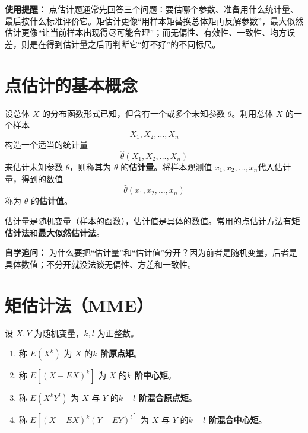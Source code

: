 ﻿\documentclass[lang=cn,11pt]{elegantbook}
\begin{document}
\begin{note}
\textbf{使用提醒：} 点估计题通常先回答三个问题：要估哪个参数、准备用什么统计量、最后按什么标准评价它。矩估计更像“用样本矩替换总体矩再反解参数”，最大似然估计更像“让当前样本出现得尽可能合理”；而无偏性、有效性、一致性、均方误差，则是在得到估计量之后再判断它“好不好”的不同标尺。
\end{note}

\section{点估计的基本概念}

\begin{definition}[点估计] \label{def:point-est}
设总体 \(X\) 的分布函数形式已知，但含有一个或多个未知参数 \(\theta\)。利用总体 \(X\) 的一个样本 \[X_1, X_2, \dots, X_n\]
构造一个适当的统计量 \[\hat{\theta}(X_1, X_2, \dots, X_n)\] 
来估计未知参数 \(\theta\)，则称其为 \(\theta\) 的\textbf{估计量}。将样本观测值 \(x_1, x_2, \dots, x_n\)代入估计量，得到的数值 \[\hat{\theta}(x_1, x_2, \dots, x_n)\] 称为 \(\theta\) 的\textbf{估计值}。
\end{definition}

\begin{note}
估计量是随机变量（样本的函数），估计值是具体的数值。常用的点估计方法有\textbf{矩估计法}和\textbf{最大似然估计法}。
\end{note}

\begin{note}
\textbf{自学追问：} 为什么要把“估计量”和“估计值”分开？因为前者是随机变量，后者是具体数值；不分开就没法谈无偏性、方差和一致性。
\end{note}

\section{矩估计法（MME）} \label{subsec:mme}

\begin{definition}[矩] \label{def:moments}
设 \(X, Y\) 为随机变量，\(k, l\) 为正整数。
\begin{enumerate}
    \item 称 \(E(X^k)\) 为 \(X\) 的\textbf{\(k\) 阶原点矩}。
    \item 称 \(E[(X - EX)^k]\) 为 \(X\) 的\textbf{\(k\) 阶中心矩}。
    \item 称 \(E(X^k Y^l)\) 为 \(X\) 与 \(Y\) 的\textbf{\(k+l\) 阶混合原点矩}。
    \item 称 \(E[(X - EX)^k (Y - EY)^l]\) 为 \(X\) 与 \(Y\) 的\textbf{\(k+l\) 阶混合中心矩}。
\end{enumerate}
\end{definition}
\end{document}
